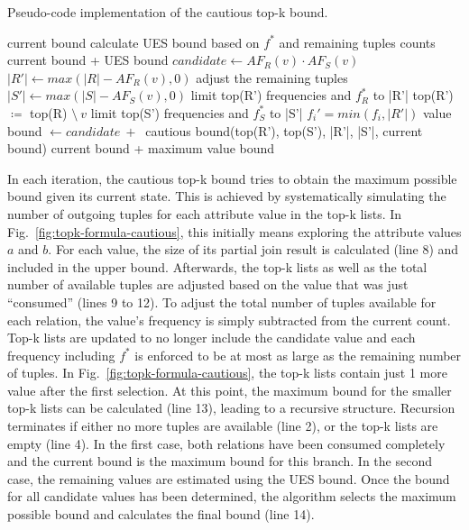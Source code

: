 \begin{algorithm}[tb]
    \caption{Pseudo-code implementation of the cautious top-k bound.}
    \label{alg:cautious-topk-bound}
    \begin{algorithmic}[1]
                \State \Return current bound
            \EndIf
                \State calculate UES bound based on $f^*$ and remaining tuples counts
                \State \Return current bound + UES bound
            \EndIf
                \State $candidate \gets AF_R(v) \cdot AF_S(v)$
                \State $|R'| \gets max(|R| - AF_R(v), 0)$ \Comment adjust the remaining tuples
                \State $|S'| \gets max(|S| - AF_S(v), 0)$
                \State limit top(R') frequencies and $f^\ast_R$ to |R'| \Comment top(R') $\coloneqq$ top(R) $\setminus\:v$
                \State limit top(S') frequencies and $f^\ast_S$ to |S'| \Comment $f_i' = min(f_i, |R'|)$
                \State value bound $\gets candidate\:+\:$ cautious bound(top(R'), top(S'), |R'|, |S'|, current bound) 
            \EndFor
            \State \Return current bound + maximum value bound
        \EndFunction
    \end{algorithmic}
\end{algorithm}

In each iteration, the cautious top-k bound tries to obtain the maximum possible bound given its current state. 
This is achieved by systematically simulating the number of outgoing tuples for each attribute value in the top-k lists. In Fig.~\ref{fig:topk-formula-cautious}, this initially means exploring the attribute values $a$ and $b$.
For each value, the size of its partial join result is calculated (line 8) and included in the upper bound. 
Afterwards, the top-k lists as well as the total number of available tuples are adjusted based on the value that was just ``consumed'' (lines 9 to 12). 
To adjust the total number of tuples available for each relation, the value's frequency is simply subtracted from the current count. 
Top-k lists are updated to no longer include the candidate value and each frequency including $f^\ast$ is enforced to be at most as large as the remaining number of tuples. In Fig.~\ref{fig:topk-formula-cautious}, the top-k lists contain just 1 more value after the first selection.
At this point, the maximum bound for the smaller top-k lists can be calculated (line 13), leading to a recursive structure. 
Recursion terminates if either no more tuples are available (line 2), or the top-k lists are empty (line 4). 
In the first case, both relations have been consumed completely and the current bound is the maximum bound for this branch. 
In the second case, the remaining values are estimated using the UES bound. 
Once the bound for all candidate values has been determined, the algorithm selects the maximum possible bound and calculates the final bound (line 14).

